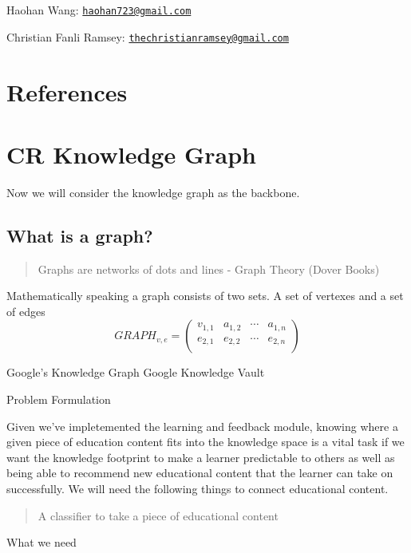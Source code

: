 \documentclass[]{book}
\theoremstyle{definition}
\theoremstyle{definition}
\theoremstyle{definition}
\theoremstyle{remark}
\begin{document}
Haohan Wang:
\href{mailto:haohan723@gmail.com}{\nolinkurl{haohan723@gmail.com}}

Christian Fanli Ramsey:
\href{mailto:thechristianramsey@gmail.com}{\nolinkurl{thechristianramsey@gmail.com}}

\chapter{References}\label{references}

\chapter{CR Knowledge Graph}\label{cr-knowledge-graph}

Now we will consider the knowledge graph as the backbone.

\section{What is a graph?}\label{what-is-a-graph-1}

\begin{quote}
Graphs are networks of dots and lines - Graph Theory (Dover Books)
\end{quote}

Mathematically speaking a graph consists of two sets. A set of vertexes
and a set of edges \[GRAPH_{v,e} =
 \begin{pmatrix}
  v_{1,1} & a_{1,2} & \cdots & a_{1,n} \\
  e_{2,1} & e_{2,2} & \cdots & e_{2,n} \\
 \end{pmatrix}\]

Google's Knowledge Graph Google Knowledge Vault

Problem Formulation

Given we've impletemented the learning and feedback module, knowing
where a given piece of education content fits into the knowledge space
is a vital task if we want the knowledge footprint to make a learner
predictable to others as well as being able to recommend new educational
content that the learner can take on successfully. We will need the
following things to connect educational content.

\begin{quote}
A classifier to take a piece of educational content
\end{quote}

What we need
\end{document}
